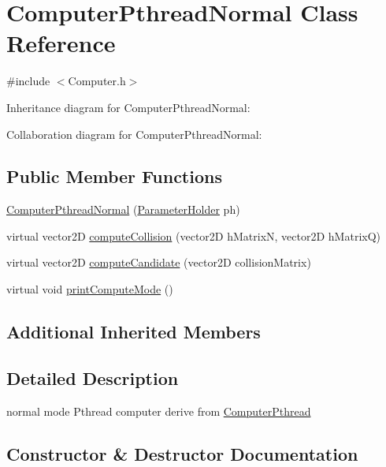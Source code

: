 \hypertarget{classComputerPthreadNormal}{}\section{Computer\+Pthread\+Normal Class Reference}
\label{classComputerPthreadNormal}


{\ttfamily \#include $<$Computer.\+h$>$}



Inheritance diagram for Computer\+Pthread\+Normal\+:


Collaboration diagram for Computer\+Pthread\+Normal\+:
\subsection*{Public Member Functions}
\begin{DoxyCompactItemize}
\item 
\hyperlink{classComputerPthreadNormal_aecae2bfbc96bb11f3d13637328e6b2c7}{Computer\+Pthread\+Normal} (\hyperlink{structParameterHolder}{Parameter\+Holder} ph)
\item 
virtual vector2D \hyperlink{classComputerPthreadNormal_a4d9dbf2290c78869df3a9e8f7ec86752}{compute\+Collision} (vector2D h\+MatrixN, vector2D h\+MatrixQ)
\item 
virtual vector2D \hyperlink{classComputerPthreadNormal_aae5e993712a0dbde8fe8f19e655081ba}{compute\+Candidate} (vector2D collision\+Matrix)
\item 
virtual void \hyperlink{classComputerPthreadNormal_a31f8543d40d67c82fe2426d059e42b1a}{print\+Compute\+Mode} ()
\end{DoxyCompactItemize}
\subsection*{Additional Inherited Members}


\subsection{Detailed Description}
normal mode Pthread computer derive from \hyperlink{classComputerPthread}{Computer\+Pthread} 

\subsection{Constructor \& Destructor Documentation}
